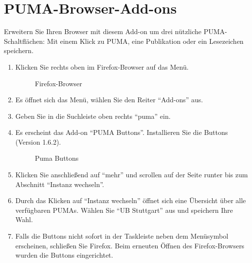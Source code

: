 \section{PUMA-Browser-Add-ons}\label{addon}
Erweitern Sie Ihren Browser mit diesem Add-on um drei nützliche PUMA-Schaltflächen: Mit einem Klick zu PUMA, eine Publikation oder ein Lesezeichen speichern.\newline
\begin{enumerate}
\item Klicken Sie rechts oben im Firefox-Browser auf das Menü.
\begin{figure}[h!]
 \centering
 \caption{Firefox-Browser}
 \label{figure021}
\end{figure} 
\item Es öffnet sich das Menü, wählen Sie den Reiter \enquote{Add-ons} aus. 
\item Geben Sie in die Suchleiste oben rechts \enquote{puma} ein.
\item Es erscheint das Add-on \enquote{PUMA Buttons}. Installieren Sie die Buttons (Version 1.6.2).
\begin{figure}[h!]
 \centering
 \caption{Puma Buttons}
 \label{figure022}
\end{figure} 
\item Klicken Sie anschließend auf \enquote{mehr} und scrollen auf der Seite runter bis zum Abschnitt \enquote{Instanz wechseln}. 
\item Durch das Klicken auf \enquote{Instanz wechseln} öffnet sich eine Übersicht über alle verfügbaren PUMAs. Wählen Sie  \enquote{UB Stuttgart} aus und speichern Ihre Wahl.
\item Falls die Buttons nicht sofort in der Taskleiste neben dem Menüsymbol  erscheinen, schließen Sie Firefox. Beim erneuten Öffnen des Firefox-Browsers wurden die Buttons eingerichtet.
\end{enumerate}
